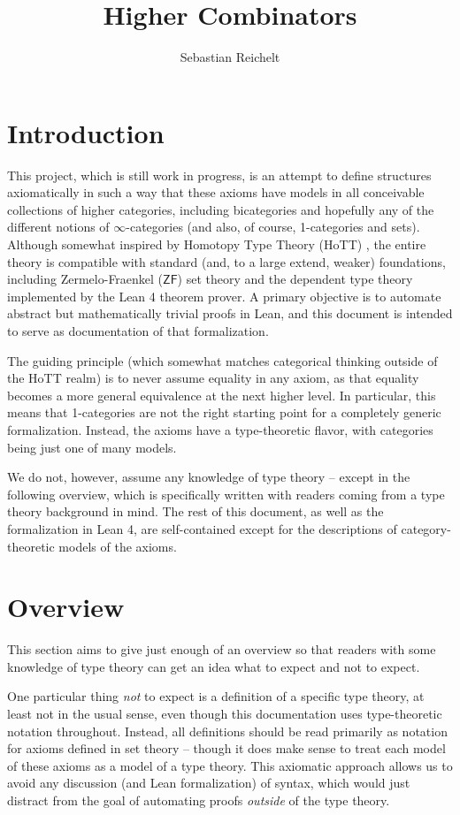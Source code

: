 \documentclass[a4paper]{article}
\title{Higher Combinators}
\author{Sebastian Reichelt}
\theoremstyle{definition}
\theoremstyle{remark}
\newcommand{\ZF}{\mathsf{ZF}}
\begin{document}
\maketitle

\section{Introduction}

This project, which is still work in progress, is an attempt to define structures axiomatically in
such a way that these axioms have models in all conceivable collections of higher categories,
including bicategories and hopefully any of the different notions of $\infty$-categories (and also,
of course, 1-categories and sets).
Although somewhat inspired by Homotopy Type Theory (HoTT) \cite{hottbook}, the entire theory is
compatible with standard (and, to a large extend, weaker) foundations, including Zermelo-Fraenkel
($\ZF$) set theory and the dependent type theory implemented by the Lean 4 \cite{lean4} theorem
prover. A primary objective is to automate abstract but mathematically trivial proofs in Lean, and
this document is intended to serve as documentation of that formalization.

The guiding principle (which somewhat matches categorical thinking outside of the HoTT realm) is to
never assume equality in any axiom, as that equality becomes a more general equivalence at the next
higher level. In particular, this means that 1-categories are not the right starting point for a
completely generic formalization. Instead, the axioms have a type-theoretic flavor, with categories
being just one of many models.

We do not, however, assume any knowledge of type theory -- except in the following overview, which
is specifically written with readers coming from a type theory background in mind. The rest of this
document, as well as the formalization in Lean 4, are self-contained except for the descriptions of
category-theoretic models of the axioms.

\section{Overview}

This section aims to give just enough of an overview so that readers with some knowledge of type
theory can get an idea what to expect and not to expect.

One particular thing \emph{not} to expect is a definition of a specific type theory, at least not in
the usual sense, even though this documentation uses type-theoretic notation throughout. Instead,
all definitions should be read primarily as notation for axioms defined in set theory -- though
it does make sense to treat each model of these axioms as a model of a type theory. This axiomatic
approach allows us to avoid any discussion (and Lean formalization) of syntax, which would just
distract from the goal of automating proofs \emph{outside} of the type theory.
\end{document}
